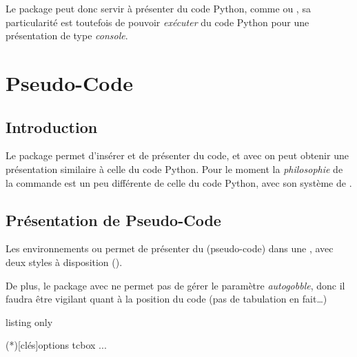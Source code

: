 \begin{noteblock}
Le package  peut donc servir à présenter du code Python, comme  ou , sa particularité est toutefois de pouvoir \textit{exécuter} du code \textsf{Python} pour une présentation de type \textit{console}.
\end{noteblock}

\newpage

\section{Pseudo-Code}\label{pseudocode}

\subsection{Introduction}

\begin{noteblock}
Le {package}  permet d'insérer et de présenter du code, et avec  on peut obtenir une présentation similaire à celle du code \textsf{Python}. Pour le moment la \textit{philosophie} de la commande est un peu différente de celle du code \textsf{Python}, avec son système de .
\end{noteblock}

\subsection{Présentation de Pseudo-Code}

\begin{tipblock}
Les environnements  ou  permet de présenter du (pseudo-code) dans une , avec deux styles à disposition ().
\end{tipblock}

\begin{warningblock}
De plus, le package  avec  ne permet pas de gérer le paramètre \textit{autogobble}, donc il faudra être vigilant quant à la position du code (pas de tabulation en fait\ldots)
\end{warningblock}

\begin{PresCodeTexPL}{listing only}
\begin{PseudoCode}(*)[clés]{options tcbox}
...
\end{PseudoCode}
\end{PresCodeTexPL}

